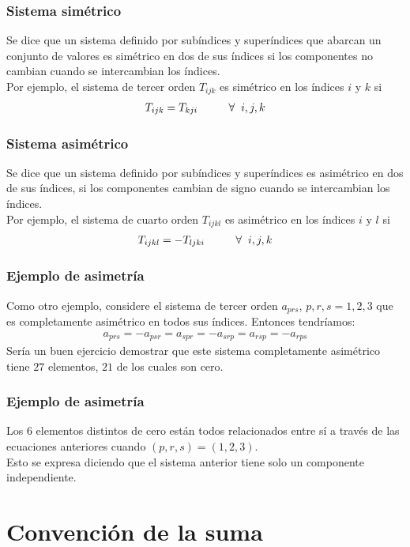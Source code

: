 \documentclass[12pt]{beamer}
\begin{document}
\begin{frame}
\frametitle{Sistema simétrico}
Se dice que un sistema definido por subíndices y superíndices que abarcan un conjunto de valores es simétrico en dos de sus índices si los componentes no cambian cuando se intercambian los índices.
\\
\bigskip
\pause
Por ejemplo, el sistema de tercer orden $T_{ijk}$ es simétrico en los índices $i$ y $k$ si
\begin{align*}
T_{ijk} = T_{kji} \hspace{1cm} \forall \hspace{0.2cm} i, j, k
\end{align*}
\end{frame}
\begin{frame}
\frametitle{Sistema asimétrico}
Se dice que un sistema definido por subíndices y superíndices es asimétrico en dos de sus índices, si los componentes cambian de signo cuando se intercambian los índices.
\\
\bigskip
\pause
Por ejemplo, el sistema de cuarto orden $T_{ijkl}$ es asimétrico en los índices $i$ y $l$ si
\begin{align*}
T_{ijkl} = -T_{ljki} \hspace{1cm} \forall \hspace{0.2cm} i, j, k
\end{align*}
\end{frame}
\begin{frame}
\frametitle{Ejemplo de asimetría}
Como otro ejemplo, considere el sistema de tercer orden $a_{prs}$, $p, r, s = 1, 2, 3$ que es completamente asimétrico en todos sus índices. \pause Entonces tendríamos:
\begin{align*}
a_{prs} = - a_{psr} = a_{spr} = -a_{srp} = a_{rsp} = -a_{rps}
\end{align*}
 Sería un buen ejercicio demostrar que este sistema completamente asimétrico tiene $27$ elementos, $21$ de los cuales son cero.
\end{frame}
\begin{frame}
\frametitle{Ejemplo de asimetría}
Los $6$ elementos distintos de cero están todos relacionados entre sí a través de las ecuaciones anteriores cuando $(p, r, s) = (1, 2, 3)$. 
\\
\bigskip
Esto se expresa diciendo que el sistema anterior tiene solo un componente independiente.
\end{frame}

\section{Convención de la suma}
\end{document}
